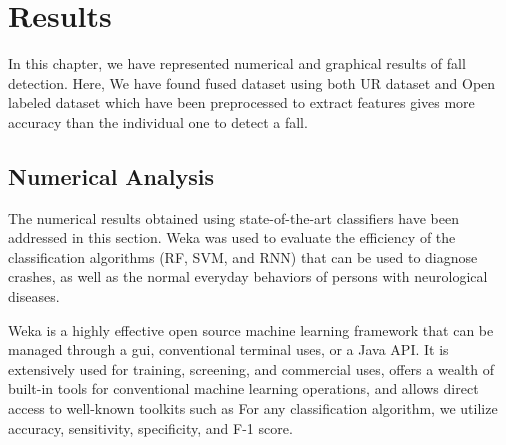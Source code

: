 \chapter{Results}
In this chapter, we have represented numerical and graphical results of fall detection. Here, We have found fused dataset using both UR dataset and Open labeled dataset which have been preprocessed to extract features gives more accuracy than the individual one to detect a fall. 

\section{Numerical Analysis}

The numerical results obtained using state-of-the-art classifiers have been addressed in this section. Weka was used to evaluate the efficiency of the classification algorithms (RF, SVM, and RNN) that can be used to diagnose crashes, as well as the normal everyday behaviors of persons with neurological diseases. 

\vspace{.5cm}

Weka is a highly effective open source machine learning framework that can be managed through a gui, conventional terminal uses, or a Java API. It is extensively used for training, screening, and commercial uses, offers a wealth of built-in tools for conventional machine learning operations, and allows direct access to well-known toolkits such as For any classification algorithm, we utilize accuracy, sensitivity, specificity, and F-1 score.




